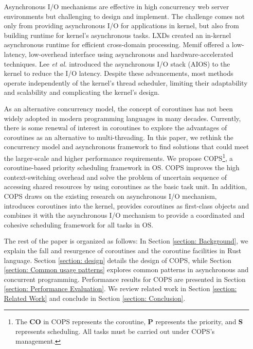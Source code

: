 \documentclass[conference]{IEEEtran}
\begin{document}
Asynchronous I/O mechanisms are effective in high concurrency web server environments but challenging to design and implement. The challenge comes not only from providing asynchronous I/O for applications in kernel, but also from building runtime for kernel's asynchronous tasks. LXDs \cite{narayanan2019lxds} created an in-kernel asynchronous runtime for efficient cross-domain processing. Memif \cite{lin2016memif} offered a low-latency, low-overhead interface using asynchronous and hardware-accelerated techniques. Lee \textit{et al.} \cite{lee2019asynchronous} introduced the asynchronous I/O stack (AIOS) to the kernel to reduce the I/O latency. Despite these advancements, most methods operate independently of the kernel's thread scheduler, limiting their adaptability and scalability and complicating the kernel's design.

As an alternative concurrency model, the concept of coroutines has not been widely adopted in modern programming languages in many decades. Currently, there is some renewal of interest in coroutines to explore the advantages of coroutines as an alternative to multi-threading. In this paper, we rethink the concurrency model and asynchronous framework to find solutions that could meet the larger-scale and higher performance requirements. We propose COPS\footnote{The \textbf{CO} in COPS represents the coroutine, \textbf{P} represents the priority, and \textbf{S} represents scheduling. All tasks must be carried out under COPS's management.}, a coroutine-based priority scheduling framework in OS. COPS improves the high context-switching overhead and solve the problem of uncertain sequence of accessing shared resources by using coroutines as the basic task unit. In addition, COPS draws on the existing research on asynchronous I/O mechanism, introduces coroutines into the kernel, provides coroutines as first-class objects and combines it with the asynchronous I/O mechanism to provide a coordinated and cohesive scheduling framework for all tasks in OS. 

The rest of the paper is organized as follows: In Section \ref{section: Background}, we explain the fall and resurgence of coroutines and the coroutine facilities in Rust language. Section \ref{section: design} details the design of COPS, while Section \ref{section: Common usage patterns} explores common patterns in asynchronous and concurrent programming. Performance results for COPS are presented in Section \ref{section: Performance Evaluation}. We review related work in Section \ref{section: Related Work} and conclude in Section \ref{section: Conclusion}.
\end{document}
